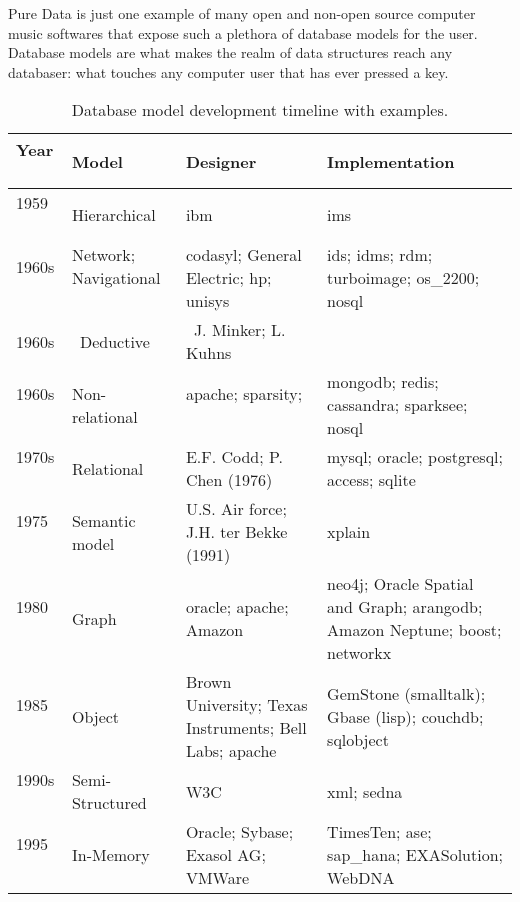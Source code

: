 Pure Data is just one example of many open and non-open source computer music softwares that expose such a plethora of database models for the user. Database models are what makes the realm of data structures reach any databaser: what touches any computer user that has ever pressed a key.


\begin{landscape}
\begin{table}
\begin{tabular}{ l | p{2cm} | p{4.5cm} | p{12.5cm}}

Year \
& Model \
& Designer \
& Implementation

\tabularnewline
\hline

1959 \
& Hierarchical \
& \gls{ibm} \
& \gls{ims}

\tabularnewline
\hline

1960s \
& Network; Navigational \
& \gls{codasyl}; General Electric; \gls{hp}; \gls{unisys} \
& \gls{ids}; \gls{idms}; \gls{rdm}; \gls{turboimage}; \gls{os_2200}; \gls{nosql}

\tabularnewline
\hline

1960s & \
Deductive & \
J. Minker; L. Kuhns

\tabularnewline
\hline

1960s \
& Non-relational \
& \gls{apache}; \gls{sparsity}; \
& \gls{mongodb}; \gls{redis}; \gls{cassandra}; \gls{sparksee}; \gls{nosql}

\tabularnewline
\hline

1970s \
& Relational \
& E.F. Codd; P. Chen (1976) \
& \gls{mysql}; \gls{oracle}; \gls{postgresql}; \gls{access}; \gls{sqlite} 

\tabularnewline
\hline

1975 \
& Semantic model \
& U.S. Air force; J.H. ter Bekke (1991) \
& \gls{xplain}

\tabularnewline
\hline

1980 \
& Graph \
& \gls{oracle}; \gls{apache}; Amazon \
& \gls{neo4j}; Oracle Spatial and Graph; \gls{arangodb}; Amazon Neptune; \gls{boost}; \gls{networkx}

\tabularnewline
\hline

1985 \
& Object \
& Brown University; Texas Instruments; Bell Labs; \gls{apache} \
& GemStone (\gls{smalltalk}); Gbase (\gls{lisp}); \gls{couchdb}; \gls{sqlobject}

\tabularnewline
\hline

1990s \
& Semi-Structured \
& W3C \
& \gls{xml}; \gls{sedna}

\tabularnewline
\hline

1995 \
& In-Memory \
& Oracle; Sybase; Exasol AG; VMWare \
& TimesTen; \gls{ase}; \gls{sap_hana}; EXASolution; WebDNA

\end{tabular}

\caption{Database model development timeline with examples.}
\label{tab:dbmodels}
\end{table}
\end{landscape}